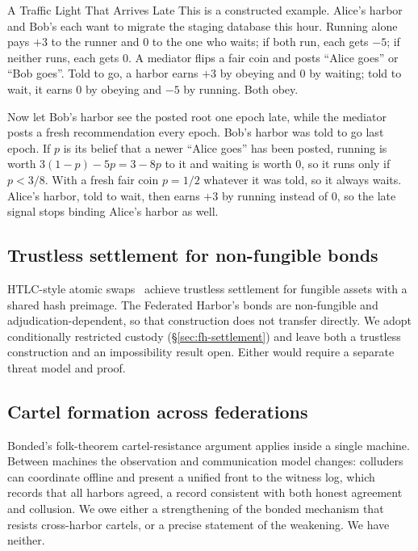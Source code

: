 \documentclass[11pt,a4paper]{article}
\theoremstyle{definition}
\theoremstyle{remark}
\begin{document}
\begin{pdexample}{A Traffic Light That Arrives Late}
\setlength{\parskip}{4pt plus 1pt}
This is a constructed example. Alice's harbor and Bob's each want to migrate the staging database this hour. Running alone pays $+3$ to the runner and $0$ to the one who waits; if both run, each gets $-5$; if neither runs, each gets $0$. A mediator flips a fair coin and posts ``Alice goes'' or ``Bob goes''. Told to go, a harbor earns $+3$ by obeying and $0$ by waiting; told to wait, it earns $0$ by obeying and $-5$ by running. Both obey.

Now let Bob's harbor see the posted root one epoch late, while the mediator posts a fresh recommendation every epoch. Bob's harbor was told to go last epoch. If $p$ is its belief that a newer ``Alice goes'' has been posted, running is worth $3(1-p)-5p=3-8p$ to it and waiting is worth $0$, so it runs only if $p<3/8$. With a fresh fair coin $p=1/2$ whatever it was told, so it always waits. Alice's harbor, told to wait, then earns $+3$ by running instead of $0$, so the late signal stops binding Alice's harbor as well.
\end{pdexample}

\subsection{Trustless settlement for non-fungible bonds}\label{sec:fh-lim-trustless}

HTLC-style atomic swaps~ achieve trustless settlement for fungible assets with a shared hash preimage. The Federated Harbor's bonds are non-fungible and adjudication-dependent, so that construction does not transfer directly. We adopt conditionally restricted custody (\S\ref{sec:fh-settlement}) and leave both a trustless construction and an impossibility result open. Either would require a separate threat model and proof.

\subsection{Cartel formation across federations}\label{sec:fh-lim-cartel}

Bonded's folk-theorem cartel-resistance argument applies inside a single machine. Between machines the observation and communication model changes: colluders can coordinate offline and present a unified front to the witness log, which records that all harbors agreed, a record consistent with both honest agreement and collusion. We owe either a strengthening of the bonded mechanism that resists cross-harbor cartels, or a precise statement of the weakening. We have neither.
\end{document}
